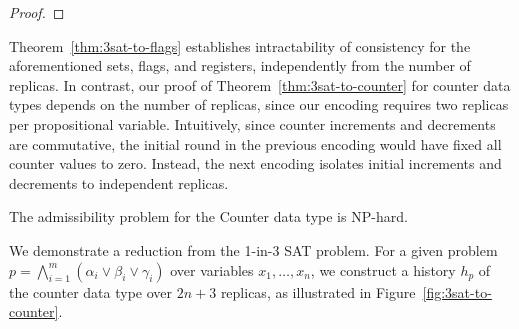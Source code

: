 \begin{proof}
\end{proof}

Theorem~\ref{thm:3sat-to-flags} establishes intractability of consistency for the aforementioned sets, flags, and registers, independently from the number of replicas. In contrast, our proof of Theorem~\ref{thm:3sat-to-counter} for counter data types depends on the number of replicas, since our encoding requires two replicas per propositional variable. Intuitively, since counter increments and decrements are commutative, the initial round in the previous encoding would have fixed all counter values to zero. Instead, the next encoding isolates initial increments and decrements to independent replicas.

\vspace{-1mm}
\begin{theorem}
  \label{thm:3sat-to-counter}

  The admissibility problem for the Counter data type is NP-hard.

\vspace{-1mm}
\end{theorem}

We demonstrate a reduction from the 1-in-3 SAT problem. For a given problem $p = \bigwedge_{i=1}^{m} (\alpha_i \lor \beta_i \lor \gamma_i)$ over variables $x_1, \ldots, x_n$, we construct a history $h_p$ of the counter data type over $2n+3$ replicas, as illustrated in Figure~\ref{fig:3sat-to-counter}.

